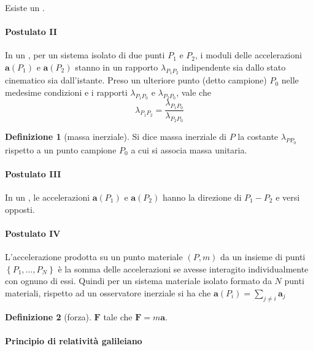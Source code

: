 \documentclass[a4paper,10pt]{article}
\theoremstyle{definition}
\newcommand{\bv}{\boldsymbol} %
\theoremstyle{indentdefinition}
\newtheorem{defn}{Definizione}[section]
\theoremstyle{indenttheorem}
\theoremstyle{myremark}
\theoremstyle{indentgeneral}
\begin{document}
Esiste un .

\paragraph{Postulato II\label{par:Postulato-II}}

In un , per un sistema isolato
di due punti $P_{1}$ e $P_{2}$, i moduli delle accelerazioni $\boldsymbol{a}\left(P_{1}\right)$
e $\boldsymbol{a}\left(P_{2}\right)$ stanno in un rapporto $\lambda_{P_{1}P_{2}}$
indipendente sia dallo stato cinematico sia dall'istante. Preso un
ulteriore punto (detto campione) $P_{0}$ nelle medesime condizioni
e i rapporti $\lambda_{P_{1}P_{0}}$ e $\lambda_{P_{2}P_{0}}$, vale
che 
\[
\lambda_{P_{1}P_{2}}=\frac{\lambda_{P_{1}P_{0}}}{\lambda_{P_{2}P_{0}}}
\]

\begin{defn}[massa inerziale]
\label{def:massa-inerziale}Si dice massa inerziale di $P$ la costante
$\lambda_{PP_{0}}$ rispetto a un punto campione $P_{0}$ a cui si
associa massa unitaria.
\end{defn}


\paragraph{Postulato III\label{par:Postulato-III}}

In un , le accelerazioni $\boldsymbol{a}\left(P_{1}\right)$
e $\boldsymbol{a}\left(P_{2}\right)$ hanno la direzione di $P_{1}-P_{2}$
e versi opposti.

\paragraph{Postulato IV\label{par:Postulato-IV}}

L'accelerazione prodotta su un punto materiale $\left(P,m\right)$
da un insieme di punti $\left\{ P_{1},\dots,P_{N}\right\} $ è la
somma delle accelerazioni se avesse interagito individualmente con
ognuno di essi. Quindi per un sistema materiale isolato formato da $N$ punti materiali, rispetto ad un osservatore inerziale si ha che $\bv{a}(P_i)=\sum_{j\ne i}\bv{a}_{j}$
\begin{defn}[forza]
\label{def:forza}$\boldsymbol{F}$ tale che $\boldsymbol{F}=m\boldsymbol{a}$.
\end{defn}


\paragraph{Principio di relatività galileiano}
\end{document}
